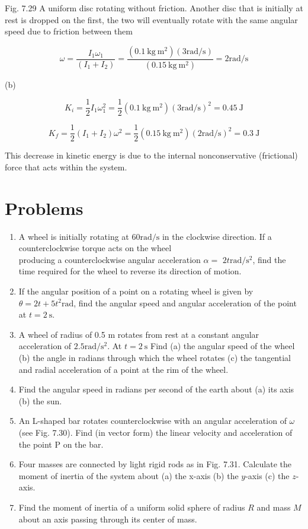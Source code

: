 \documentclass[10pt]{article}
\begin{document}
Fig. 7.29 A uniform disc rotating without friction. Another disc that is initially at rest is dropped on the first, the two will eventually rotate with the same angular speed due to friction between them

$$
\omega=\frac{I_{1} \omega_{1}}{\left(I_{1}+I_{2}\right)}=\frac{\left(0.1 \mathrm{~kg} \mathrm{~m}^{2}\right)(3 \mathrm{rad} / \mathrm{s})}{\left(0.15 \mathrm{~kg} \mathrm{~m}^{2}\right)}=2 \mathrm{rad} / \mathrm{s}
$$

(b)

$$
K_{i}=\frac{1}{2} I_{1} \omega_{1}^{2}=\frac{1}{2}\left(0.1 \mathrm{~kg} \mathrm{~m}^{2}\right)(3 \mathrm{rad} / \mathrm{s})^{2}=0.45 \mathrm{~J}
$$

$$
K_{f}=\frac{1}{2}\left(I_{1}+I_{2}\right) \omega^{2}=\frac{1}{2}\left(0.15 \mathrm{~kg} \mathrm{~m}^{2}\right)(2 \mathrm{rad} / \mathrm{s})^{2}=0.3 \mathrm{~J}
$$

This decrease in kinetic energy is due to the internal nonconservative (frictional) force that acts within the system.

\section*{Problems}
\begin{enumerate}
  \item A wheel is initially rotating at $60 \mathrm{rad} / \mathrm{s}$ in the clockwise direction. If a counterclockwise torque acts on the wheel\\
producing a counterclockwise angular acceleration $\alpha=$ $2 t \mathrm{rad} / \mathrm{s}^{2}$, find the time required for the wheel to reverse its direction of motion.
  \item If the angular position of a point on a rotating wheel is given by $\theta=2 t+5 t^{2} \mathrm{rad}$, find the angular speed and angular acceleration of the point at $t=2 \mathrm{~s}$.
  \item A wheel of radius of 0.5 m rotates from rest at a constant angular acceleration of $2.5 \mathrm{rad} / \mathrm{s}^{2}$. At $t=2 \mathrm{~s}$ Find (a) the angular speed of the wheel (b) the angle in radians through which the wheel rotates (c) the tangential and radial acceleration of a point at the rim of the wheel.
  \item Find the angular speed in radians per second of the earth about (a) its axis (b) the sun.
  \item An L-shaped bar rotates counterclockwise with an angular acceleration of $\omega$ (see Fig. 7.30). Find (in vector form) the linear velocity and acceleration of the point P on the bar.
  \item Four masses are connected by light rigid rods as in Fig. 7.31. Calculate the moment of inertia of the system about (a) the x-axis (b) the $y$-axis (c) the $z$-axis.
  \item Find the moment of inertia of a uniform solid sphere of radius $R$ and mass $M$ about an axis passing through its center of mass.
\end{enumerate}
\end{document}
